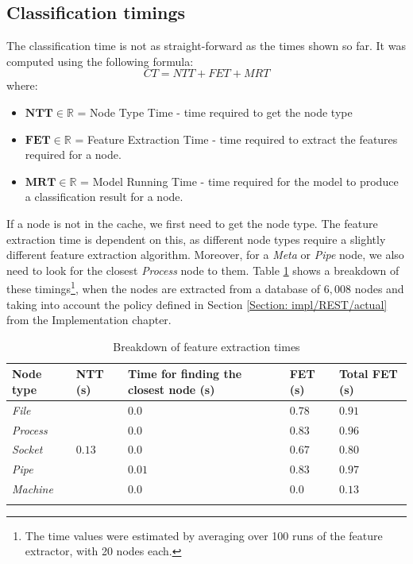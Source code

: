 		\subsection{Classification timings} \label{Section: eval/service-time/classification}
			The classification time is not as straight-forward as the times shown so far. It was computed using the following formula:
			\begin{equation}
				CT = NTT + FET + MRT
			\end{equation}
			where: 
			\begin{itemize}
				\item $\mathbf{NTT} \in \mathbb{R}$ = Node Type Time - time required to get the node type
				\item $\mathbf{FET} \in \mathbb{R}$ = Feature Extraction Time - time required to extract the features required for a node.
				\item $\mathbf{MRT} \in \mathbb{R}$ = Model Running Time - time required for the model to produce a classification result for a node.
			\end{itemize}
			If a node is not in the cache, we first need to get the node type. The feature extraction time is dependent on this, as different node types require a slightly different feature extraction algorithm. Moreover, for a \textit{Meta} or \textit{Pipe} node, we also need to look for the closest \textit{Process} node to them. Table \ref{Table: eval/service-time/classification/fet} shows a breakdown of these timings\footnote{The time values were estimated by averaging over 100 runs of the feature extractor, with 20 nodes each.}, when the nodes are extracted from a database of $6,008$ nodes and taking into account the policy defined in Section \ref{Section: impl/REST/actual} from the Implementation chapter.
			\begin{longtable}{|p{} || p{} | p{}| p{}| p{} | }
				\textbf{Node type} & \textbf{NTT} (s) & \textbf{Time for finding the closest node} (s)& \textbf{FET} (s)& \textbf{Total FET} (s)\\
				\hline
				\textit{File} & \multirow{5}{*}{$0.13$}& $0.0$ & $0.78$& $\mathbf{0.91}$ \\
				\hhline{-~---}
				\textit{Process} & & $0.0$ & $0.83$ & $\mathbf{0.96}$\\
				\hhline{-~---}
				\textit{Socket} & & $0.0$ & $0.67$ & $\mathbf{0.80}$ \\
				\hhline{-~---}
				\textit{Pipe} & & $0.01$ & $0.83$ & $\mathbf{0.97}$ \\
				\hhline{-~---}
				\textit{Machine} & & $0.0$ & $0.0$ & $\mathbf{0.13}$\\
				\hline
				\caption{Breakdown of feature extraction times}
				\label{Table: eval/service-time/classification/fet}
			\end{longtable}		
